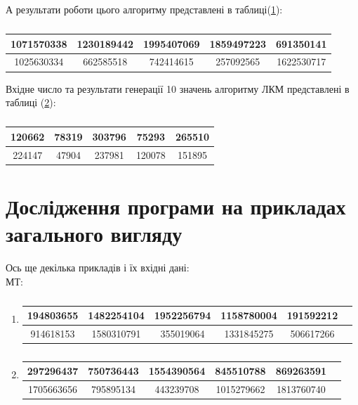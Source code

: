 \documentclass[oneside,final,14pt]{extreport}
\begin{document}
\begin{large}
А результати роботи цього алгоритму представлені в таблиці(\ref{t:61}):\\
\begin{table}[H]
	\centering
\begin{tabular}{|c|c|c|c|c|}
	\hline
1071570338  & 1230189442 &  1995407069  & 1859497223 &  691350141 \\ \hline   
1025630334  &  662585518   &  742414615   &  257092565  &  1622530717 \\ \hline
\end{tabular}
\caption{}
\label{t:61}
\end{table}
Вхідне число та результати генерації 10 значень алгоритму ЛКМ представлені в таблиці (\ref{t:62}):\\
\begin{table}[H]
	\centering
\begin{tabular}{|c|c|c|c|c|}
	\hline 120662 & 78319 & 303796 & 75293 & 265510 \\ \hline 
	224147 & 47904 & 237981 & 120078 & 151895 \\ \hline
\end{tabular}
\caption{}
\label{t:62}
\end{table}

\section{Дослідження програми на прикладах загального вигляду}\label{s:63}
Ось ще декілька прикладів і їх вхідні дані:\\
МТ:
\begin{enumerate}
	\item
	\begin{table}[H]
		\centering
	\begin{tabular}{|c|c|c|c|c|c|}
		\hline
		194803655   & 1482254104  & 1952256794 &  1158780004 &  191592212    \\ \hline
		914618153  & 1580310791  & 355019064  & 1331845275 & 506617266\\ \hline   
	\end{tabular}
	\caption{}
	\label{t:63}
	\end{table}
	\item 
		\begin{table}[H]
			\centering
		\begin{tabular}{|c|c|c|c|c|c}
			\hline
			297296437  & 750736443 &  1554390564 &  845510788 &  869263591   \\ \hline
1705663656  & 795895134 &  443239708  & 1015279662 &  1813760740 \\ \hline   
		\end{tabular}
		\caption{}
		\label{t:64}
		\end{table}


\end{enumerate}
\end{large}
\end{document}
